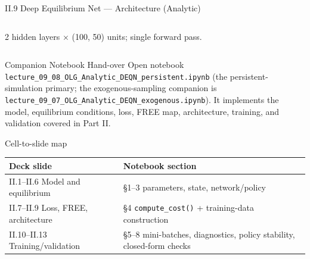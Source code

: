 \documentclass[aspectratio=169,11pt]{beamer}
\newcommand{\emphc}[1]{\textcolor{harvardcrimson}{#1}}
\begin{document}
\begin{frame}{II.9 Deep Equilibrium Net --- Architecture (Analytic)}
\begin{columns}[T,totalwidth=0.96\textwidth]

{\footnotesize 2 hidden layers $\times$ (100, 50) units; single forward pass.}
\end{columns}
\end{frame}


\begin{frame}{Companion Notebook Hand-over}
\scriptsize
\emphc{Open notebook \texttt{lecture\_09\_08\_OLG\_Analytic\_DEQN\_persistent.ipynb}} (the persistent-simulation primary; the exogenous-sampling companion is \texttt{lecture\_09\_07\_OLG\_Analytic\_DEQN\_exogenous.ipynb}).  It implements the model, equilibrium conditions, loss, FREE map, architecture, training, and validation covered in Part II.
\vspace{-2pt}
\begin{block}{Cell-to-slide map}
\vspace{-4pt}
\begin{center}\renewcommand{\arraystretch}{0.85}
{\scriptsize
\begin{tabular}{ll}
\toprule
\textbf{Deck slide} & \textbf{Notebook section} \\
\midrule
II.1--II.6 Model and equilibrium        & \S 1--3 \;parameters, state, network/policy \\
II.7--II.9 Loss, FREE, architecture     & \S 4 \;\texttt{compute\_cost()} + training-data construction \\
II.10--II.13 Training/validation        & \S 5--8 \;mini-batches, diagnostics, policy stability, closed-form checks \\
\bottomrule
\end{tabular}}
\end{center}
\vspace{-4pt}
\end{block}
\end{frame}
\end{document}
